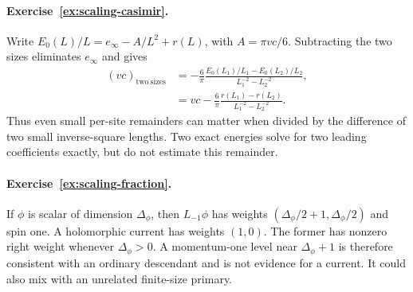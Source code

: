 \paragraph{Exercise~\ref{ex:scaling-casimir}.}
\label{sol:ex:scaling-casimir}
Write
$E_0(L)/L=e_\infty-A/L^2+r(L)$, with $A=\pi vc/6$.
Subtracting the two sizes eliminates $e_\infty$ and gives
\begin{align*}
 (vc)_{\mathrm{two\ sizes}}
 &=-\frac6\pi
 \frac{E_0(L_1)/L_1-E_0(L_2)/L_2}
 {L_1^{-2}-L_2^{-2}},\\
 &=vc-\frac6\pi\frac{r(L_1)-r(L_2)}
 {L_1^{-2}-L_2^{-2}}.
\end{align*}
Thus even small per-site remainders can matter when divided by
the difference of two small inverse-square lengths. Two exact
energies solve for two leading coefficients exactly, but do not
estimate this remainder.



\paragraph{Exercise~\ref{ex:scaling-fraction}.}
\label{sol:ex:scaling-fraction}
If $\phi$ is scalar of dimension $\Delta_\phi$, then
$L_{-1}\phi$ has weights
$(\Delta_\phi/2+1,\Delta_\phi/2)$ and spin one. A holomorphic
current has weights $(1,0)$. The former has nonzero right weight
whenever $\Delta_\phi>0$. A momentum-one level near
$\Delta_\phi+1$ is therefore consistent with an ordinary
descendant and is not evidence for a current. It could also mix
with an unrelated finite-size primary.



